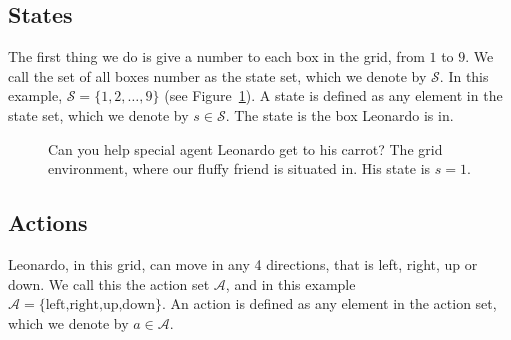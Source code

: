\documentclass[
  letterpaper,
]{report}
\theoremstyle{definition}
\theoremstyle{plain}
\theoremstyle{definition}
\theoremstyle{remark}
\begin{document}
\subsection{States}\label{states}

The first thing we do is give a number to each box in the grid, from
\(1\) to \(9\). We call the set of all boxes number as the state set,
which we denote by \(\mathcal{S}\). In this example,
\(\mathcal{S} = \{1,2,\dots,9\}\) (see Figure~\ref{fig-gridworld1}). A
state is defined as any element in the state set, which we denote by
\(s\in\mathcal{S}\). The state is the box Leonardo is in.

\begin{figure}


\caption{\label{fig-gridworld1}Can you help special agent Leonardo get
to his carrot? The grid environment, where our fluffy friend is situated
in. His state is \(s=1\).}

\end{figure}%

\subsection{Actions}\label{actions}

Leonardo, in this grid, can move in any 4 directions, that is left,
right, up or down. We call this the action set \(\mathcal{A}\), and in
this example \(\mathcal{A} = \{\text{left,right,up,down}\}\). An action
is defined as any element in the action set, which we denote by
\(a\in\mathcal{A}\).
\end{document}
